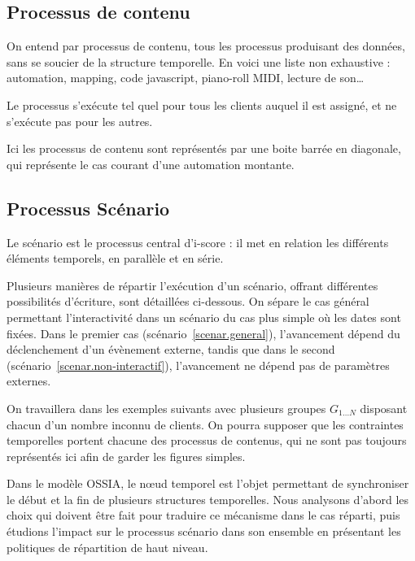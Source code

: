 \documentclass[10pt]{article}
\newcommand\ossia{OSSIA\xspace}
\begin{document}

\subsection{Processus de contenu}
On entend par processus de contenu, tous les processus produisant des données, sans se soucier de la structure temporelle. 
En voici une liste non exhaustive : automation, mapping, code javascript, piano-roll MIDI, lecture de son\dots

Le processus s'exécute tel quel pour tous les clients auquel il est assigné, 
et ne s'exécute pas pour les autres.

Ici les processus de contenu sont représentés par une boite barrée en diagonale, qui représente le cas courant d'une automation montante.

\subsection{Processus Scénario}
Le scénario est le processus central d'i-score : il met en relation les différents éléments temporels, en parallèle et en série.

Plusieurs manières de répartir l'exécution d'un scénario, offrant différentes possibilités d'écriture, sont détaillées ci-dessous. 
On sépare le cas général permettant l'interactivité dans un scénario du cas plus simple où les dates sont fixées.
Dans le premier cas (scénario~\ref{scenar.general}), l'avancement dépend du déclenchement d'un évènement externe, tandis que dans le second (scénario~\ref{scenar.non-interactif}), l'avancement ne dépend pas de paramètres externes. 

On travaillera dans les exemples suivants avec plusieurs groupes $G_{1\dots N}$ disposant chacun d'un nombre inconnu de clients. 
On pourra supposer que les contraintes temporelles portent chacune des processus de contenus, qui ne sont pas toujours représentés ici afin de garder les figures simples.

Dans le modèle \ossia, le nœud temporel est l'objet permettant de synchroniser le début et la fin de plusieurs structures temporelles. 
Nous analysons d'abord les choix qui doivent être fait pour traduire ce mécanisme dans le cas réparti, puis étudions l'impact sur le processus scénario dans son ensemble en présentant les politiques de répartition de haut niveau.
\end{document}
